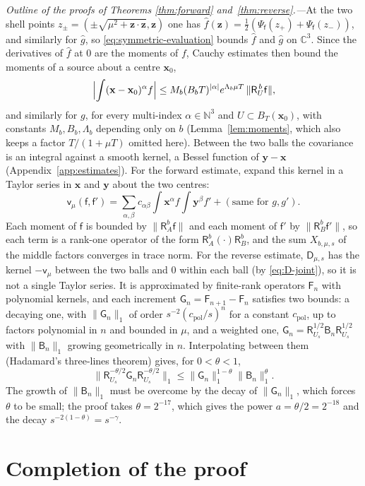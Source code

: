 \documentclass[aps,prl,reprint,longbibliography,raggedbottom]{revtex4-2}
\newcommand{\C}{\mathbb C}
\newcommand{\N}{\mathbb N}
\newcommand{\norm}[1]{\lVert #1\rVert}
\newcommand{\abs}[1]{\lvert #1\rvert}
\newcommand{\Res}{\mathsf R}
\newcommand{\JointRes}{\Res_{U_s}}
\newcommand{\JointD}{\mathsf D}
\newcommand{\cov}{\mathsf v}
\newcommand{\sx}{\mathsf f}
\newcommand{\sy}{\mathsf f'}
\newcommand{\bx}{\mathbf x}
\newcommand{\by}{\mathbf y}
\newcommand{\bz}{\mathbf z}
\begin{document}
\emph{Outline of the proofs of Theorems \ref{thm:forward}
and~\ref{thm:reverse}.---}At the two shell points
$z_\pm=(\pm\sqrt{\mu^2+\bz\cdot\bz},\bz)$ one has
$\hat f(\bz)=\frac12({\Psi_\sx(z_+)+\Psi_\sx(z_-)})$, and similarly for
$\hat g$, so \eqref{eq:symmetric-evaluation} bounds $\hat f$ and
$\hat g$ on $\C^3$. Since the derivatives of $\hat f$ at $0$ are the
moments of $f$, Cauchy estimates then bound the moments of a source
about a centre $\bx_0$,
\[
\Bigl|\int(\bx-\bx_0)^\alpha f\Bigr|
\le M_b(B_bT)^{\abs\alpha}e^{\Lambda_b\mu T}\,\norm{\Res_U^{\,b}\sx},
\]
and similarly for $g$, for every multi-index $\alpha\in\N^3$ and
$U\subset B_T(\bx_0)$, with constants $M_b,B_b,\Lambda_b$ depending
only on $b$ (Lemma~\ref{lem:moments}, which also keeps a factor
$T/(1+\mu T)$ omitted here). Between the two balls the covariance is an
integral against a smooth kernel, a Bessel function of $\by-\bx$
(Appendix~\ref{app:estimates}). For the forward estimate, expand this
kernel in a Taylor series in $\bx$ and $\by$ about the two centres:
\[
\cov_\mu(\sx,\sy)=\sum_{\alpha,\beta}c_{\alpha\beta}
\int\bx^\alpha f\int\by^\beta f'+(\text{same for }g,g').
\]
Each moment of $\sx$ is bounded by $\norm{\Res_A^b\sx}$ and each
moment of $\sy$ by $\norm{\Res_B^b\sy}$, so each term is a rank-one
operator of the form $\Res_A^b(\cdot)\Res_B^b$, and the sum $X_{b,\mu,s}$
of the middle factors converges in trace norm. For the reverse
estimate, $\JointD_{\mu,s}$ has the kernel $-\cov_\mu$ between the two
balls and $0$ within each ball (by \eqref{eq:D-joint}), so it is not a
single Taylor series. It is approximated by finite-rank operators
$\mathsf F_n$ with polynomial kernels, and each increment
$\mathsf G_n=\mathsf F_{n+1}-\mathsf F_n$ satisfies two bounds: a
decaying one, with $\norm{\mathsf G_n}_1$ of order
$s^{-2}(c_{\mathrm{pol}}/s)^n$ for a constant $c_{\mathrm{pol}}$, up
to factors polynomial in $n$ and bounded in $\mu$, and a
weighted one,
$\mathsf G_n=\JointRes^{1/2}\mathsf B_n\JointRes^{1/2}$ with
$\norm{\mathsf B_n}_1$ growing geometrically in $n$. Interpolating
between them (Hadamard's three-lines theorem) gives, for
$0<\theta<1$,
\[
\norm{\JointRes^{-\theta/2}\mathsf G_n\JointRes^{-\theta/2}}_1
\le\norm{\mathsf G_n}_1^{1-\theta}\norm{\mathsf B_n}_1^{\theta}.
\]
The growth of $\norm{\mathsf B_n}_1$ must be overcome by the decay
of $\norm{\mathsf G_n}_1$, which forces $\theta$ to be small; the
proof takes $\theta=2^{-17}$, which gives the power $a=\theta/2=2^{-18}$
and the decay $s^{-2(1-\theta)}=s^{-\gamma}$.

\section{Completion of the proof}\label{sec:completion}
\end{document}

